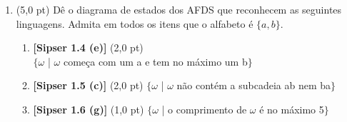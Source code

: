 \documentclass[12pt,a4paper,oneside]{article}
\begin{document}
\begin{enumerate}
	
	\item (5,0 pt) Dê o diagrama de estados dos AFDS que reconhecem as seguintes linguagens. Admita em todos os itens que o alfabeto é  $\{a,b\}$.
		\begin{enumerate}
			\item {\bf [Sipser 1.4 (e)]} (2,0 pt) \\$\{\omega$ | $\omega$ começa com um {\sf a} e tem no máximo um {\sf b}$\}$
			\item {\bf [Sipser 1.5 (c)]} (2,0 pt) $\{\omega$ | $\omega$ não contém a subcadeia {\sf ab} nem {\sf ba}$\}$
			\item {\bf [Sipser 1.6 (g)]} (1,0 pt) $\{\omega$ | o comprimento de $\omega$ é no máximo 5$\}$
		\end{enumerate}

\end{enumerate}
\end{document}
